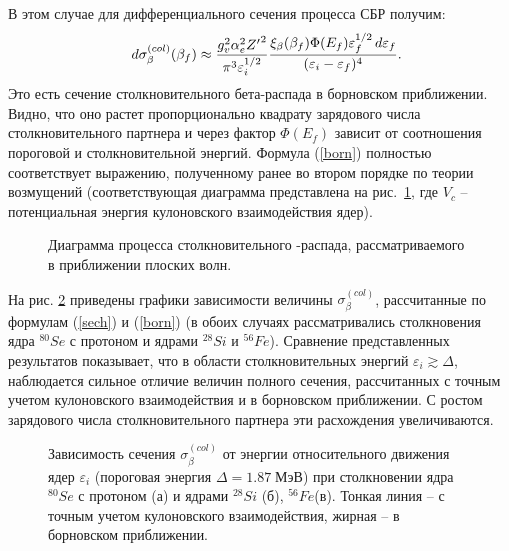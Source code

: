 В этом случае для дифференциального сечения процесса СБР получим:
\begin{eqnarray}\label{born}
&&d\sigma^{(col)}_\beta(\beta_f)\approx
{{g_v^2\alpha_e^2  {Z'}^2}\over{\pi^3\varepsilon^{1/2}_i}}{\xi_\beta(\beta_f)
\Phi(E_f)\varepsilon_f^{1/2}\,d\varepsilon_f\over (\varepsilon_i-\varepsilon_f)^4}.
\end{eqnarray}
Это есть сечение столкновительного бета-распада в борновском приближении. Видно, что оно  растет пропорционально квадрату
зарядового числа столкновительного партнера и через фактор $\Phi(E_f)$ зависит от соотношения пороговой и
столкновительной энергий. Формула (\ref{born}) полностью соответствует выражению, полученному ранее во втором порядке по
теории возмущений \cite{batkin} (соответствующая диаграмма представлена на рис.~\ref{DBORN}, где $V_c$ -- потенциальная
энергия кулоновского взаимодействия ядер).

\begin{figure}
\vspace{5 true cm}
\caption{Диаграмма процесса столкновительного \be-распада, рассматриваемого
в приближении плоских волн.}
\label{DBORN}
\end{figure}


На рис. \ref{RBORN} приведены графики зависимости величины $\sigma^{(col)}_\beta$,
рассчитанные по формулам (\ref{sech}) и (\ref{born}) (в обоих случаях
рассматривались столкновения ядра $^{80}Se$ с протоном и ядрами
$^{28}Si$ и $^{56}Fe$). Сравнение представленных результатов показывает,
что в области столкновительных энергий $\varepsilon_i\gtrsim\Delta$,
наблюдается сильное отличие величин полного сечения, рассчитанных
с точным учетом
кулоновского взаимодействия и в борновском приближении. С ростом
зарядового числа столкновительного партнера эти расхождения увеличиваются.


\begin{figure}
\vspace{18 true cm}
\caption{{ Зависимость сечения  $\sigma^{(col)}_\beta$ от энергии относительного
движения ядер $\varepsilon_i$ (пороговая энергия $\Delta=1.87 \; МэВ$)  при столкновении
ядра ${}^{80}Se$ с протоном (а) и ядрами $^{28}Si$ (б), $^{56}Fe$(в).
Тонкая линия -- с точным учетом кулоновского взаимодействия,
жирная -- в борновском приближении.}}
\label{RBORN}
\end{figure}




